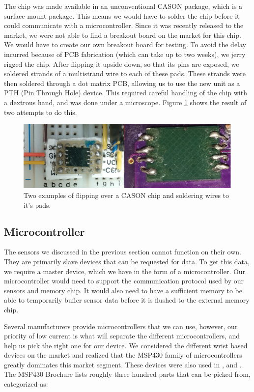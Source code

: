The chip was made available in an unconventional CASON package,
which is a surface mount package.
This means we would have to solder the chip before it could communicate with a microcontroller.
Since it was recently released to the market,
we were not able to find a breakout board on the market for this chip.
We would have to create our own breakout board for testing.
To avoid the delay incurred because of PCB fabrication (which can take up to two weeks), we jerry rigged the chip. After flipping it upside down, so that its pins are exposed, we soldered strands of a multistrand wire to each of these pads. These strands were then soldered through a dot matrix PCB, allowing us to use the new unit as a PTH (Pin Through Hole) device. This required careful handling of the chip with a dextrous hand, and was done under a microscope. Figure \ref{Fig:CASON} shows the result of two attempts to do this. 

\begin{figure}
\begin{center}
\includegraphics[width=1.0\textwidth]{images/CASON.jpg}
\caption{Two examples of flipping over a CASON chip and soldering wires to it's pads.}
\label{Fig:CASON}
\end{center}
\end{figure}
 

\subsection{Microcontroller}
\label{Sec:MicroController}

The sensors we discussed in the previous section cannot function on their own. They are primarily slave devices that can be requested for data. To get this data, we require a master device, which we have in the form of a microcontroller. Our microcontroller would need to support the communication protocol used by our sensors and memory chip. It would also need to have a sufficient memory to be able to temporarily buffer sensor data before it is flushed to the external memory chip. 

Several manufacturers provide microcontrollers that we can use, however, our priority of low current is what will separate the different microcontrollers, and help us pick the right one for our device. We considered the different wrist based devices on the market and realized that the MSP430 family of microcontrollers greatly dominates this market segment. These devices were also used in \cite{lo2005body}, \cite{polastre2005telos} and \cite{werner2006deploying}. The MSP430 Brochure \cite{instruments2009msp430} lists roughly three hundred parts that can be picked from, categorized as:

